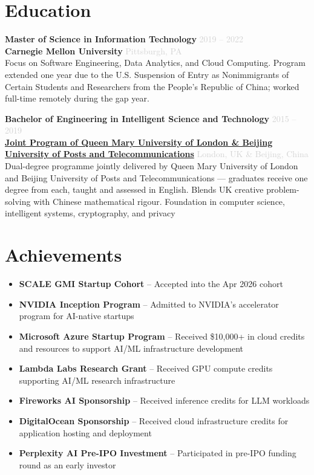 \documentclass[11pt,a4paper]{article}
\newcommand{\resumeItem}[1]{\item #1}
\newcommand{\daterange}[1]{\hfill \textcolor{lightgray}{\small #1}}
\newcommand{\location}[1]{\hfill \textcolor{lightgray}{\small #1}}
\begin{document}
\section{Education}

\textbf{Master of Science in Information Technology} \daterange{2019 -- 2022}\\
\textbf{Carnegie Mellon University} \location{Pittsburgh, PA}\\
Focus on Software Engineering, Data Analytics, and Cloud Computing. Program extended one year due to the U.S. Suspension of Entry as Nonimmigrants of Certain Students and Researchers from the People's Republic of China; worked full-time remotely during the gap year.

\vspace{6pt}

\textbf{Bachelor of Engineering in Intelligent Science and Technology} \daterange{2015 -- 2019}\\
\textbf{\href{https://www.qmul.ac.uk/eecs/china/}{Joint Program of Queen Mary University of London \& Beijing University of Posts and Telecommunications}} \location{London, UK \& Beijing, China}\\
Dual-degree programme jointly delivered by Queen Mary University of London and Beijing University of Posts and Telecommunications --- graduates receive one degree from each, taught and assessed in English. Blends UK creative problem-solving with Chinese mathematical rigour. Foundation in computer science, intelligent systems, cryptography, and privacy

\section{Achievements}
\begin{itemize}[leftmargin=*, nosep, itemsep=2pt]
    \resumeItem{\textbf{SCALE GMI Startup Cohort} -- Accepted into the Apr 2026 cohort}
    \resumeItem{\textbf{NVIDIA Inception Program} -- Admitted to NVIDIA's accelerator program for AI-native startups}
    \resumeItem{\textbf{Microsoft Azure Startup Program} -- Received \$10,000+ in cloud credits and resources to support AI/ML infrastructure development}
    \resumeItem{\textbf{Lambda Labs Research Grant} -- Received GPU compute credits supporting AI/ML research infrastructure}
    \resumeItem{\textbf{Fireworks AI Sponsorship} -- Received inference credits for LLM workloads}
    \resumeItem{\textbf{DigitalOcean Sponsorship} -- Received cloud infrastructure credits for application hosting and deployment}
    \resumeItem{\textbf{Perplexity AI Pre-IPO Investment} -- Participated in pre-IPO funding round as an early investor}
\end{itemize}
\end{document}
